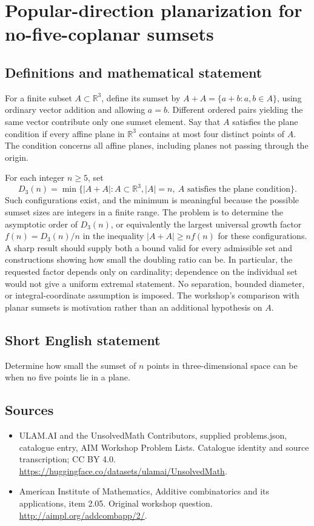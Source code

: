 \documentclass[11pt,a4paper]{article}
\begin{document}
\section*{Popular-direction planarization for no-five-coplanar sumsets}\label{statement}

\subsection{Definitions and mathematical statement}
For a finite subset $A\subset\mathbb R^3$, define its sumset by
$A+A=\{a+b:a,b\in A\}$, using ordinary vector addition and allowing $a=b$.
Different ordered pairs yielding the same vector contribute only one sumset element.
Say that $A$ satisfies the plane condition if every affine plane in $\mathbb R^3$ contains at most four distinct points of $A$.
The condition concerns all affine planes, including planes not passing through the origin.

For each integer $n\geq5$, set
\[
 D_3(n)=\min\{|A+A|: A\subset\mathbb R^3,
       |A|=n,\ A\text{ satisfies the plane condition}\}.
\]
Such configurations exist, and the minimum is meaningful because the possible sumset sizes are integers in a finite range.
The problem is to determine the asymptotic order of $D_3(n)$, or equivalently the largest universal growth factor $f(n)=D_3(n)/n$ in the inequality $|A+A|\geq n f(n)$ for these configurations.
A sharp result should supply both a bound valid for every admissible set and constructions showing how small the doubling ratio can be.
In particular, the requested factor depends only on cardinality; dependence on the individual set would not give a uniform extremal statement.
No separation, bounded diameter, or integral-coordinate assumption is imposed.
The workshop's comparison with planar sumsets is motivation rather than an additional hypothesis on $A$.
\subsection{Short English statement}
Determine how small the sumset of $n$ points in three-dimensional space can be when no five points lie in a plane.
\subsection{Sources}
\begin{itemize}
\item[S1] ULAM.AI and the UnsolvedMath Contributors, supplied problems.json, catalogue entry, AIM Workshop Problem Lists. Catalogue identity and source transcription; CC BY 4.0.
\url{https://huggingface.co/datasets/ulamai/UnsolvedMath}.
\item[S2] American Institute of Mathematics, Additive combinatorics and its applications, item 2.05. Original workshop question.
\url{http://aimpl.org/addcombapp/2/}.
\end{itemize}
\end{document}

